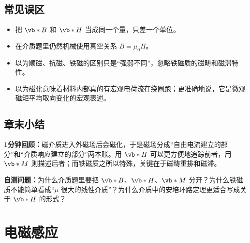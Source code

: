 \documentclass[lang=cn,11pt]{elegantbook}
\newcommand{\summaryline}[1]{\par\noindent\textbf{1分钟回顾：}#1\par}
\newcommand{\chapterselfcheck}[1]{\par\noindent\textbf{自测问题：}#1\par}
\begin{document}
\section{常见误区}

\begin{itemize}
 \item 把 \(\vb*{B}\) 和 \(\vb*{H}\) 当成同一个量，只差一个单位。
 \item 在介质题里仍然机械使用真空关系 \(B=\mu_0H\)。
 \item 以为顺磁、抗磁、铁磁的区别只是“强弱不同”，忽略铁磁质的磁畴和磁滞特性。
 \item 以为磁化意味着材料内部真的有宏观电荷流在绕圈跑；更准确地说，它是微观磁矩平均取向变化的宏观表述。
\end{itemize}

\section{章末小结}

\summaryline{磁介质进入外磁场后会磁化，于是磁场分成“自由电流建立的部分”和“介质响应建立的部分”两本账。用 \(\vb*{H}\) 可以更方便地追踪前者，用 \(\vb*{M}\) 则描述后者；而铁磁质之所以特殊，关键在于磁畴重排和磁滞。}
\chapterselfcheck{为什么介质题里要把 \(\vb*{B}\)、\(\vb*{H}\)、\(\vb*{M}\) 分开？为什么铁磁质不能简单看成“\(\mu\) 很大的线性介质”？为什么介质中的安培环路定理更适合写成关于 \(\vb*{H}\) 的形式？}

\chapter{电磁感应}
\end{document}
